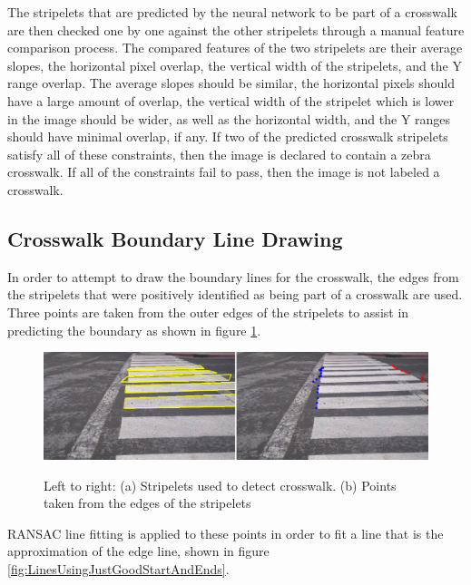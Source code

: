 \documentclass[12pt]{ucthesis}
\newcommand{\captionfonts}{\small\bf\ssp}
\begin{document}
The stripelets that are predicted by the neural network to be part of a crosswalk are then checked one by one against the other stripelets through a manual feature comparison process. The compared features of the two stripelets are their average slopes, the horizontal pixel overlap, the vertical width of the stripelets, and the Y range overlap. The average slopes should be similar, the horizontal pixels should have a large amount of overlap, the vertical width of the stripelet which is lower in the image should be wider, as well as the horizontal width, and the Y ranges should have minimal overlap, if any. If two of the predicted crosswalk stripelets satisfy all of these constraints, then the image is declared to contain a zebra crosswalk. If all of the constraints fail to pass, then the image is not labeled a crosswalk. 

\subsection{Crosswalk Boundary Line Drawing}

In order to attempt to draw the boundary lines for the crosswalk, the edges from the stripelets that were positively identified as being part of a crosswalk are used. Three points are taken from the outer edges of the stripelets to assist in predicting the boundary as shown in figure \ref{fig:LinesAndEdgePoints}.  

\begin{figure}[h!]
\begin{center}
\includegraphics[width=14cm]{LinesAndEdgePoints.png}
\captionfonts
\caption[Crosswalk Detected Stripelets and points along their edges]{Left to right: (a) Stripelets used to detect crosswalk. (b) Points taken from the edges of the stripelets}
\label{fig:LinesAndEdgePoints}
\end{center}
\end{figure}

RANSAC line fitting is applied to these points in order to fit a line that is the approximation of the edge line, shown in figure \ref{fig:LinesUsingJustGoodStartAndEnds}. 
\end{document}
